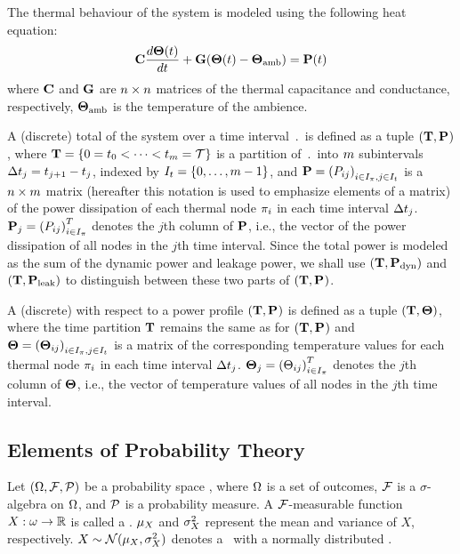The thermal behaviour of the system is modeled using the following heat equation:
\begin{equation} \equlabel{fourier}
  \mcapacitance \frac{d\vtemp(\time)}{d\time} + \mconductance (\vtemp(\time) - \vtemp_\amb) = \vpower(\time)
\end{equation}
where $\mathbf{C}$ and $\mathbf{G}$ are $n \times n$ matrices of the thermal capacitance and conductance, respectively, $\mathbf{\Theta}_{\text{amb}}$ is the temperature of the ambience.

A (discrete) total  of the system over a time interval $\period$ is defined as a tuple $(\mathbf{T}, \mathbf{P}_{})$, where $\mathbf{T} = \{ 0 = t_0 < \dots < t_{m} = \mathcal{T} \}$ is a partition of $\period$ into $m$ subintervals $\Delta t_j = t_{j+1} - t_j$, indexed by $I_t = \{ 0, \dots, m - 1 \}$, and $\mathbf{P} = \left(P_{ij}\right)_{i \in I_\pi, j \in I_t}$ is a $n \times m$ matrix (hereafter this notation is used to emphasize elements of a matrix) of the power dissipation of each thermal node $\pi_i$ in each time interval $\Delta t_j$. $\mathbf{P}_j = \left(P_{ij}\right)^T_{i \in I_\pi}$ denotes the $j$th column of $\mathbf{P}$, i.e., the vector of the power dissipation of all nodes in the $j$th time interval. Since the total power is modeled as the sum of the dynamic power and leakage power, we shall use $(\mathbf{T}, \mathbf{P}_{\text{dyn}})$ and $(\mathbf{T}, \mathbf{P}_{\text{leak}})$ to distinguish between these two parts of $(\mathbf{T}, \mathbf{P}_{})$.

A (discrete)  with respect to a power profile $(\mathbf{T}, \mathbf{P}_{})$ is defined as a tuple $(\mathbf{T}, \mathbf{\Theta})$, where the time partition $\mathbf{T}$ remains the same as for $(\mathbf{T}, \mathbf{P}_{})$ and $\mathbf{\Theta} = \left(\mathbf{\Theta}_{ij}\right)_{i \in I_\pi, j \in I_t}$ is a matrix of the corresponding temperature values for each thermal node $\pi_i$ in each time interval $\Delta t_j$. $\mathbf{\Theta}_j = \left(\Theta_{ij}\right)^T_{i \in I_\pi}$ denotes the $j$th column of $\mathbf{\Theta}$, i.e., the vector of temperature values of all nodes in the $j$th time interval.

\subsection{Elements of Probability Theory} 
Let $(\Omega, \mathcal{F}, \mathcal{P})$ be a probability space \cite{durrett2010}, where $\Omega$ is a set of outcomes, $\mathcal{F}$ is a $\sigma$-algebra on $\Omega$, and $\mathcal{P}$ is a probability measure. A $\mathcal{F}$-measurable function $X: \omega \to \mathbb{R}$ is called a . $\mu_{X}$ and $\sigma_{X}^2$ represent the mean and variance of $X$, respectively. $X \sim \mathcal{N}(\mu_{X}, \sigma_{X}^2)$ denotes a \rv\ with a normally distributed \rv.

